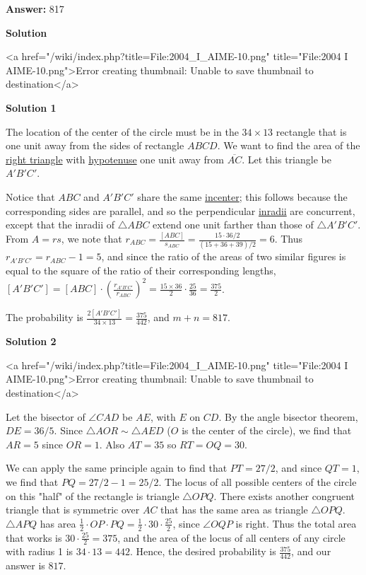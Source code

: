\begin{enumerate}
 \textbf{Answer: }817



\textbf{Solution}

<a href="/wiki/index.php?title=File:2004\_I\_AIME-10.png" title="File:2004 I AIME-10.png">Error creating thumbnail: Unable to save thumbnail to destination</a>




\textbf{Solution 1}

The location of the center of the circle must be in the $34 \times 13$ rectangle that is one unit away from the sides of rectangle $ABCD$. We want to find the area of the \href{https://artofproblemsolving.com/wiki/index.php?title=Right\_triangle}{right triangle} with \href{https://artofproblemsolving.com/wiki/index.php?title=Hypotenuse}{hypotenuse} one unit away from $\overline{AC}$. Let this triangle be $A'B'C'$.

 Notice that $ABC$ and $A'B'C'$ share the same \href{https://artofproblemsolving.com/wiki/index.php?title=Incenter}{incenter}; this follows because the corresponding sides are parallel, and so the perpendicular \href{https://artofproblemsolving.com/wiki/index.php?title=Inradius}{inradii} are concurrent, except that the inradii of $\triangle ABC$ extend one unit farther than those of $\triangle A'B'C'$. From $A = rs$, we note that $r_{ABC} = \frac{[ABC]}{s_{ABC}} = \frac{15 \cdot 36 /2}{(15+36+39)/2} = 6$. Thus $r_{A'B'C'} = r_{ABC} - 1 = 5$, and since the ratio of the areas of two similar figures is equal to the square of the ratio of their corresponding lengths, $[A'B'C'] = [ABC] \cdot \left(\frac{r_{A'B'C'}}{r_{ABC}}\right)^2 = \frac{15 \times 36}{2} \cdot \frac{25}{36} = \frac{375}{2}$. 

 The probability is $\frac{2[A'B'C']}{34 \times 13} = \frac{375}{442}$, and $m + n = \boxed{817}$.  

 



\textbf{Solution 2}

<a href="/wiki/index.php?title=File:2004\_I\_AIME-10.png" title="File:2004 I AIME-10.png">Error creating thumbnail: Unable to save thumbnail to destination</a>

 Let the bisector of $\angle CAD$ be $AE$, with $E$ on $CD$. By the angle bisector theorem, $DE = 36/5$. Since $\triangle AOR \sim \triangle AED$ ($O$ is the center of the circle), we find that $AR = 5$ since $OR = 1$. Also $AT = 35$ so $RT = OQ = 30$.

 We can apply the same principle again to find that $PT = 27/2$, and since $QT = 1$, we find that $PQ = 27/2 - 1 = 25/2$. The locus of all possible centers of the circle on this "half" of the rectangle is triangle $\triangle OPQ$. There exists another congruent triangle that is symmetric over $AC$ that has the same area as triangle $\triangle OPQ$. $\triangle APQ$ has area $\frac {1}{2}\cdot OP \cdot PQ = \frac {1}{2}\cdot 30\cdot \frac {25}{2}$, since $\angle OQP$ is right. Thus the total area that works is $30\cdot \frac {25}{2} = 375$, and the area of the locus of all centers of any circle with radius 1 is $34\cdot 13 = 442$. Hence, the desired probability is $\frac {375}{442}$, and our answer is $\boxed {817}$.


\end{enumerate}
